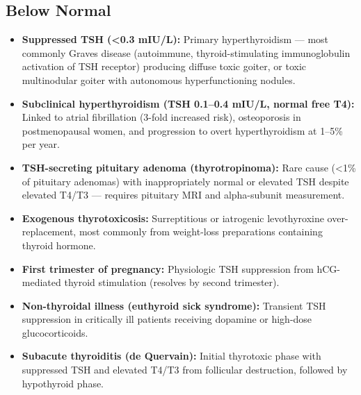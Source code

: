 \subsection*{Below Normal}
\begin{itemize}
  \item \textbf{Suppressed TSH (<0.3 mIU/L):} Primary hyperthyroidism --- most commonly Graves disease (autoimmune, thyroid-stimulating immunoglobulin activation of TSH receptor) producing diffuse toxic goiter, or toxic multinodular goiter with autonomous hyperfunctioning nodules.
  \item \textbf{Subclinical hyperthyroidism (TSH 0.1--0.4 mIU/L, normal free T4):} Linked to atrial fibrillation (3-fold increased risk), osteoporosis in postmenopausal women, and progression to overt hyperthyroidism at 1--5\% per year.
  \item \textbf{TSH-secreting pituitary adenoma (thyrotropinoma):} Rare cause (<1\% of pituitary adenomas) with inappropriately normal or elevated TSH despite elevated T4/T3 --- requires pituitary MRI and alpha-subunit measurement.
  \item \textbf{Exogenous thyrotoxicosis:} Surreptitious or iatrogenic levothyroxine over-replacement, most commonly from weight-loss preparations containing thyroid hormone.
  \item \textbf{First trimester of pregnancy:} Physiologic TSH suppression from hCG-mediated thyroid stimulation (resolves by second trimester).
  \item \textbf{Non-thyroidal illness (euthyroid sick syndrome):} Transient TSH suppression in critically ill patients receiving dopamine or high-dose glucocorticoids.
  \item \textbf{Subacute thyroiditis (de Quervain):} Initial thyrotoxic phase with suppressed TSH and elevated T4/T3 from follicular destruction, followed by hypothyroid phase.
\end{itemize}


